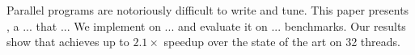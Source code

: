 Parallel programs are notoriously difficult to write and tune.
This paper presents \sys, a ... that ...
We implement \sys on ... and evaluate it on ... benchmarks.
Our results show that \sys achieves up to $2.1\times$ speedup over
the state of the art on 32 threads.
